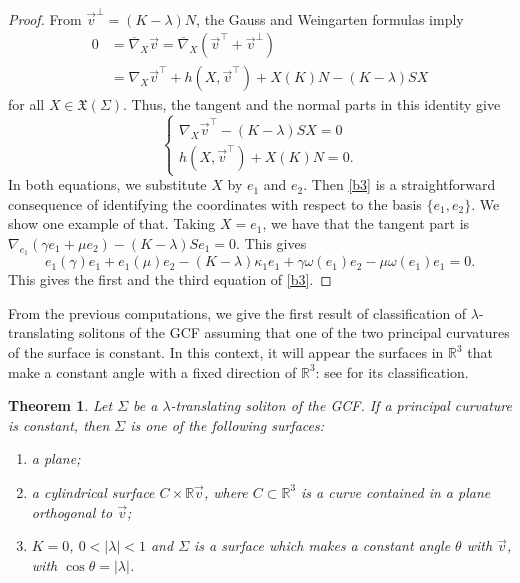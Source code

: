 \documentclass[a4paper,12pt]{amsart}
\newtheorem{theorem}{Theorem}[section]
\theoremstyle{definition}
\def\r{\mathbb R}
\begin{document}
\begin{proof} From $\vec{v}^{\perp}=(K-\lambda)N$, the Gauss and
Weingarten formulas imply 
\begin{equation*}
\begin{split}
    0&=\overline{\nabla}_{X}\vec{v}=\overline{\nabla}_{X}(\vec{v}^{\top}+\vec{v}^{\perp})\\
    &={\nabla}_{X}\vec{v}^{\top}+h(X,\vec{v}^{\top})+X(K)N-(K-\lambda)SX 
\end{split}
\end{equation*}
for all   $X\in\mathfrak{X}(\Sigma)$.
Thus,  the tangent and the normal parts in this identity give
\begin{equation*} 
    \left\{
    \begin{array}{ll}
        {\nabla}_{X}\vec{v}^{\top}-(K-\lambda)SX=0\\
        h(X, \vec{v}^{\top})+X(K)N=0.
    \end{array}
    \right.
\end{equation*}
In both equations, we substitute $X$ by $e_1$ and   $e_2$. Then \eqref{b3} is a straightforward consequence of identifying the coordinates with respect to the basis $\{e_1,e_2\}$. We show one example of that. Taking $X=e_1$, we have that the tangent part is 
$\nabla_{e_1}(\gamma e_1+\mu e_2)-(K-\lambda)Se_1=0$. This gives 
$$e_1(\gamma)e_1+e_1(\mu)e_2-(K-\lambda)\kappa_1e_1+\gamma\omega(e_1)e_2-\mu\omega(e_1)e_1=0.$$
This gives the first and the third equation of \eqref{b3}.
\end{proof}




From the previous computations, we give the first result of classification of $\lambda$-translating solitons of the GCF assuming that one of the two principal curvatures of the surface is constant.   In  this context, it will appear   the surfaces in $\r^3$ that make a constant angle with a fixed direction of $\r^3$: see \cite{mn} for its classification.


\begin{theorem}\label{t-c} Let $\Sigma$ be a $\lambda$-translating soliton of the GCF. If a principal curvature is constant, then $\Sigma$ is one of the following surfaces:
\begin{enumerate}
\item a plane;
\item a cylindrical surface $C\times\r\vec{v}$, where $C\subset\r^3$ is a curve contained in a plane orthogonal to $\vec{v}$;
\item  $K=0$, $0<|\lambda|<1$ and $\Sigma$ is a surface which makes a constant angle $\theta$ with $\vec{v}$, with $\cos\theta=|\lambda|$.
\end{enumerate}
\end{theorem}
\end{document}
